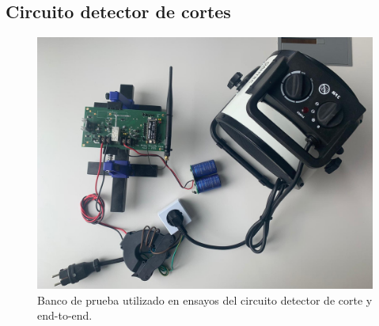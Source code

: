 \subsection{Circuito detector de cortes}
\begin{figure}
	\centering
	\includegraphics[width=1.0\linewidth]{Figures/banco_prueba_e2e_1}
	\caption{Banco de prueba utilizado en ensayos del circuito detector de corte y end-to-end.}
	\label{fig:bancopruebae2e2}
\end{figure}

